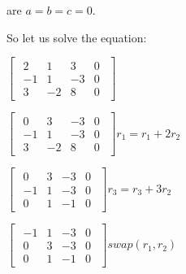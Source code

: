 \singlespacing
\singlespacing

are $a = b = c = 0$.

\singlespacing

So let us solve the equation:

\singlespacing
\singlespacing

\begin{math}
    \begin{bmatrix}
        \begin{array}{ccc|c}
            2  & 1  & 3  & 0 \\
            -1 & 1  & -3 & 0 \\
            3  & -2 & 8  & 0
        \end{array}
    \end{bmatrix}
\end{math}

\singlespacing

\begin{math}
    \begin{bmatrix}
        \begin{array}{ccc|c}
            0  & 3  & -3 & 0 \\
            -1 & 1  & -3 & 0 \\
            3  & -2 & 8  & 0
        \end{array}
    \end{bmatrix}r_1 = r_1 + 2r_2
\end{math}

\singlespacing

\begin{math}
    \begin{bmatrix}
        \begin{array}{ccc|c}
            0  & 3 & -3 & 0 \\
            -1 & 1 & -3 & 0 \\
            0  & 1 & -1 & 0
        \end{array}
    \end{bmatrix}r_3 = r_3 + 3r_2
\end{math}

\singlespacing

\begin{math}
    \begin{bmatrix}
        \begin{array}{ccc|c}
            -1 & 1 & -3 & 0 \\
            0  & 3 & -3 & 0 \\
            0  & 1 & -1 & 0
        \end{array}
    \end{bmatrix}swap(r_1, r_2)
\end{math}

